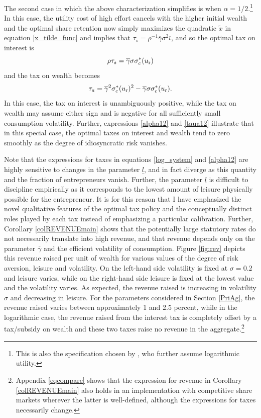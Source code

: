 \documentclass[11pt]{article}
\theoremstyle{plain}
\newcommand{\sig}{0.2}
\begin{document}
The second case in which the above characterization simplifies is when $\alpha=1/2$.\footnote{This is also the specification chosen by \cite{jones_schumpeterian_2018}, who further assume logarithmic utility.} In this case, the utility cost of high effort cancels with the higher initial wealth and the optimal share retention now simply maximizes the quadratic $\tilde{x}$ in equation \eqref{x_tilde_func} and implies that $\tau_s = \rho^{-1} \overline{\gamma} \sigma^2 \overline{\iota}$, and so the optimal tax on interest is
\begin{equation} 
\rho \tau_s = \overline{\gamma} \sigma \sigma_c^*(u_{\textnormal{r}})
\label{alpha12}
\end{equation} 
and the tax on wealth becomes
\begin{equation}
\tau_a = \overline{\gamma}^2 \sigma_c^*(u_{\textnormal{r}})^2 - \overline{\gamma} \sigma \sigma_c^*(u_{\textnormal{r}}).
\label{taua12}
\end{equation}
In this case, the tax on interest is unambiguously positive, while the tax on wealth may assume either sign and is negative for all sufficiently small consumption volatility. Further, expressions \eqref{alpha12} and \eqref{taua12} illustrate that in this special case, the optimal taxes on interest and wealth tend to zero smoothly as the degree of idiosyncratic risk vanishes. 

Note that the expressions for taxes in equations \eqref{log_system} and \eqref{alpha12} are highly sensitive to changes in the parameter $\underline{l}$, and in fact diverge as this quantity and the fraction of entrepreneurs vanish. Further, the parameter $\underline{l}$ is difficult to discipline empirically as it corresponds to the lowest amount of leisure physically possible for the entrepreneur. It is for this reason that I have emphasized the novel qualitative features of the optimal tax policy and the conceptually distinct roles played by each tax instead of emphasizing a particular calibration. Further, Corollary \ref{colREVENUEmain} shows that the potentially large statutory rates do not necessarily translate into high revenue, and that revenue depends only on the parameter $\overline{\gamma}$ and the efficient volatility of consumption. Figure \ref{fig:rev} depicts this revenue raised per unit of wealth for various values of the degree of risk aversion, leisure and volatility. On the left-hand side volatility is fixed at $\sigma=\sig$ and leisure varies, while on the right-hand side leisure is fixed at the lowest value and the volatility varies. As expected, the revenue raised is increasing in volatility $\sigma$ and decreasing in leisure. For the parameters considered in Section \ref{PriAg}, the revenue raised varies between approximately 1 and 2.5 percent, while in the logarithmic case, the revenue raised from the interest tax is completely offset by a tax/subsidy on wealth and these two taxes raise no revenue in the aggregate.\footnote{Appendix \ref{eqcompare} shows that the expression for revenue in Corollary \ref{colREVENUEmain} also holds in an implementation with competitive share markets wherever the latter is well-defined, although the expressions for taxes necessarily change.}
\end{document}

